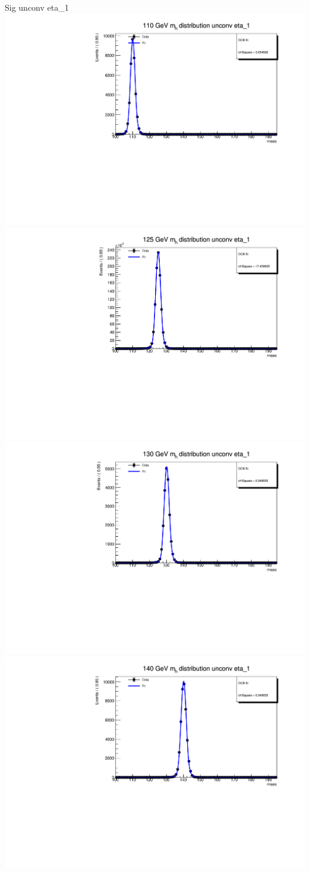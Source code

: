 \documentclass[10pt,UKenglish, leqno, xcolor = dvipsnames]{beamer}
\begin{document}
		\begin{frame}{Sig unconv eta\_1}
			\vfill
			\centering
			\includegraphics[width=.45\textwidth]{../images/week_10/PowhegPy8_NNLOPS_ggH110_unconv_eta_1_fit.pdf}
			\includegraphics[width=.45\textwidth]{../images/week_10/PowhegPy8_NNLOPS_ggH125_unconv_eta_1_fit.pdf}\\
			\includegraphics[width=.45\textwidth]{../images/week_10/PowhegPy8_NNLOPS_ggH130_unconv_eta_1_fit.pdf}
			\includegraphics[width=.45\textwidth]{../images/week_10/PowhegPy8_NNLOPS_ggH140_unconv_eta_1_fit.pdf}
			\vfill
		\end{frame}
	
\end{document}
